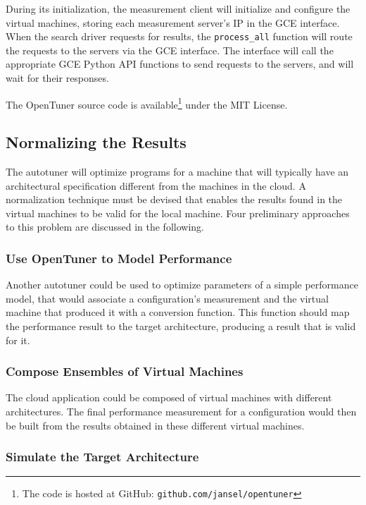 \documentclass[a4paper, 12pt]{article}
\begin{document}
During its initialization, the measurement client will
initialize and configure the virtual machines, storing
each measurement server's IP in the GCE interface.
When the search driver requests for results,
the \texttt{\footnotesize process\_all} function will route
the requests to the servers via the GCE interface.
The interface will call the appropriate GCE Python API
functions to send requests to the servers, and will wait
for their responses.

The OpenTuner source code is
available\footnote{The code is hosted at GitHub:
\texttt{\scriptsize github.com/jansel/opentuner}} under
the MIT License.



\subsection{Normalizing the Results}

The autotuner will optimize programs for a machine that will
typically have an architectural specification different
from the machines in the cloud. A normalization technique
must be devised that enables the results found in the
virtual machines to be valid for the local machine.
Four preliminary approaches to this problem are discussed
in the following.

\subsubsection{Use OpenTuner to Model Performance}

Another autotuner could be used to optimize parameters
of a simple performance model, that would associate
a configuration's measurement and the virtual machine
that produced it with a conversion function. This function
should map the performance result to the target architecture,
producing a result that is valid for it.

\subsubsection{Compose Ensembles of Virtual Machines}

The cloud application could be composed of virtual machines
with different architectures. The final performance measurement
for a configuration would then be built from the results obtained
in these different virtual machines.

\subsubsection{Simulate the Target Architecture}
\end{document}
